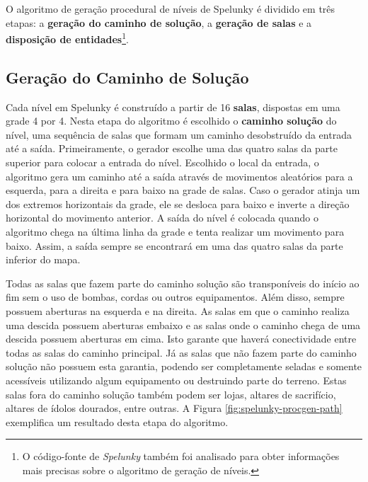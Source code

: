 O algoritmo de geração procedural de níveis de Spelunky é dividido em três
etapas: a \textbf{geração do caminho de solução}, a \textbf{geração de salas} e
a \textbf{disposição de entidades}\footnote{O código-fonte de \textit{Spelunky}
também foi analisado para obter informações mais precisas sobre o algoritmo de
geração de níveis.}\cite{SpelunkyDerekYu}.

\subsection{\label{section:spelunky-procgen-path}Geração do Caminho de Solução}
Cada nível em Spelunky é construído a partir de 16 \textbf{salas}, dispostas em
uma grade 4 por 4. Nesta etapa do algoritmo é escolhido o \textbf{caminho
solução} do nível, uma sequência de salas que formam um caminho desobstruído da
entrada até a saída. Primeiramente, o gerador escolhe uma das quatro salas da
parte superior para colocar a entrada do nível. Escolhido o local da entrada, o
algoritmo gera um caminho até a saída através de movimentos aleatórios para a
esquerda, para a direita e para baixo na grade de salas. Caso o gerador atinja
um dos extremos horizontais da grade, ele se desloca para baixo e inverte a
direção horizontal do movimento anterior. A saída do nível é colocada quando o
algoritmo chega na última linha da grade e tenta realizar um movimento para
baixo. Assim, a saída sempre se encontrará em uma das quatro salas da parte
inferior do mapa.

Todas as salas que fazem parte do caminho solução são transponíveis do início ao
fim sem o uso de bombas, cordas ou outros equipamentos. Além disso, sempre
possuem aberturas na esquerda e na direita. As salas em que o caminho realiza
uma descida possuem aberturas embaixo e as salas onde o caminho chega de uma
descida possuem aberturas em cima. Isto garante que haverá conectividade entre
todas as salas do caminho principal. Já as salas que não fazem parte do caminho
solução não possuem esta garantia, podendo ser completamente seladas e somente
acessíveis utilizando algum equipamento ou destruindo parte do terreno. Estas
salas fora do caminho solução também podem ser lojas, altares de sacrifício,
altares de ídolos dourados, entre outras. A Figura
\ref{fig:spelunky-procgen-path} exemplifica um resultado desta etapa do
algoritmo.

